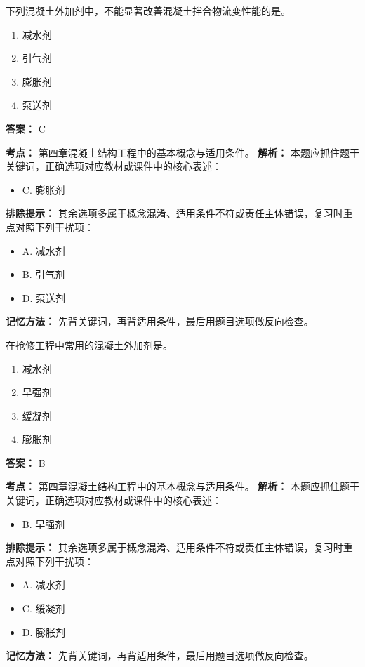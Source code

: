 \documentclass[UTF8,fontset=fandol,11pt]{ctexart}
\begin{document}
\begin{quizbox}[title={第 66 题}]
下列混凝土外加剂中，不能显著改善混凝土拌合物流变性能的是。\\
\begin{enumerate}[label=\Alph*.]
\item 减水剂
\item 引气剂
\item 膨胀剂
\item 泵送剂
\end{enumerate}
\textbf{答案：} C
\vspace{0.25em}
\begin{answerbox}[title={考点解析}]
\textbf{考点：} 第四章混凝土结构工程中的基本概念与适用条件。
\textbf{解析：} 本题应抓住题干关键词，正确选项对应教材或课件中的核心表述：
\begin{itemize}
\item C. 膨胀剂
\end{itemize}
\textbf{排除提示：} 其余选项多属于概念混淆、适用条件不符或责任主体错误，复习时重点对照下列干扰项：
\begin{itemize}
\item A. 减水剂
\item B. 引气剂
\item D. 泵送剂
\end{itemize}
\textbf{记忆方法：} 先背关键词，再背适用条件，最后用题目选项做反向检查。
\end{answerbox}
\end{quizbox}

\vspace{0.2em}

\begin{quizbox}[title={第 67 题}]
在抢修工程中常用的混凝土外加剂是。\\
\begin{enumerate}[label=\Alph*.]
\item 减水剂
\item 早强剂
\item 缓凝剂
\item 膨胀剂
\end{enumerate}
\textbf{答案：} B
\vspace{0.25em}
\begin{answerbox}[title={考点解析}]
\textbf{考点：} 第四章混凝土结构工程中的基本概念与适用条件。
\textbf{解析：} 本题应抓住题干关键词，正确选项对应教材或课件中的核心表述：
\begin{itemize}
\item B. 早强剂
\end{itemize}
\textbf{排除提示：} 其余选项多属于概念混淆、适用条件不符或责任主体错误，复习时重点对照下列干扰项：
\begin{itemize}
\item A. 减水剂
\item C. 缓凝剂
\item D. 膨胀剂
\end{itemize}
\textbf{记忆方法：} 先背关键词，再背适用条件，最后用题目选项做反向检查。
\end{answerbox}
\end{quizbox}
\end{document}
